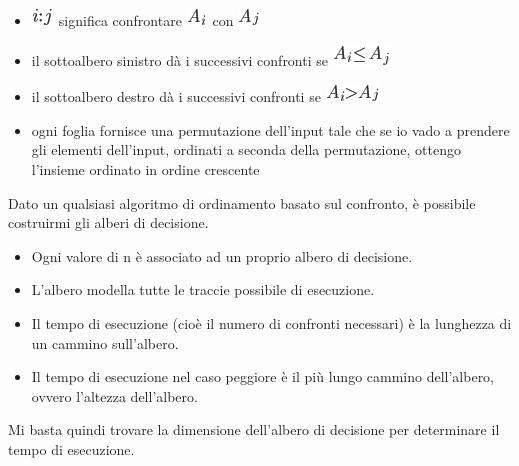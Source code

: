 \documentclass{article}
\providecommand{\tightlist}{%
  \setlength{\itemsep}{0pt}\setlength{\parskip}{0pt}}
\begin{document}
\begin{itemize}
\tightlist
\item
  \includegraphics{images/image155.png}{~significa confrontare
  }\includegraphics{images/image156.png}{~con
  }\includegraphics{images/image157.png}
\item
  {il sottoalbero sinistro dà i successivi confronti se
  }\includegraphics{images/image158.png}{~}
\item
  {il sottoalbero destro dà i successivi confronti se
  }\includegraphics{images/image159.png}{~}
\item
  {ogni foglia fornisce una permutazione dell'input tale che se io vado
  a prendere gli elementi dell'input, ordinati a seconda della
  permutazione, ottengo l'insieme ordinato in ordine crescente}
\end{itemize}

{}

{Dato un qualsiasi algoritmo di ordinamento basato sul confronto, è
possibile costruirmi gli alberi di decisione.}

{}

\begin{itemize}
\tightlist
\item
  {Ogni valore di n è associato ad un proprio albero di decisione.}
\item
  {L'albero modella tutte le traccie possibile di esecuzione.}
\item
  {Il tempo di esecuzione (cioè il numero di confronti necessari) è la
  lunghezza di un cammino sull'albero.}
\item
  {Il tempo di esecuzione nel caso peggiore è il più lungo cammino
  dell'albero, }{ovvero l'altezza dell'albero.}
\end{itemize}

{}

{Mi basta quindi trovare la dimensione dell'albero di decisione per
determinare il tempo di esecuzione.}
\end{document}
